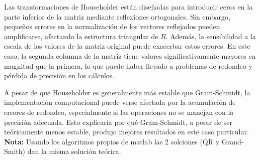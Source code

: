 \begin{homeworkProblem}
\begin{itemize}
\begin{solucion}
Las transformaciones de Householder están diseñadas para introducir ceros en la parte inferior de la matriz mediante reflexiones ortogonales. Sin embargo, pequeños errores en la normalización de los vectores reflejados pueden amplificarse, afectando la estructura triangular de \( R \). Además, la sensibilidad a la escala de los valores de la matriz original puede exacerbar estos errores. En este caso, la segunda columna de la matriz tiene valores significativamente mayores en magnitud que la primera, lo que puede haber llevado a problemas de redondeo y pérdida de precisión en los cálculos.

A pesar de que Householder es generalmente más estable que Gram-Schmidt, la implementación computacional puede verse afectada por la acumulación de errores de redondeo, especialmente si las operaciones no se manejan con la precisión adecuada. Esto explicaría por qué Gram-Schmidt, a pesar de ser teóricamente menos estable, produjo mejores resultados en este caso particular.
\textbf{Nota:} Usando los algoritmos propios de matlab las 2 solciones (QR y Grand-Smith) dan la misma solución teórica.
        \end{solucion}
    \end{itemize}
\end{homeworkProblem}
